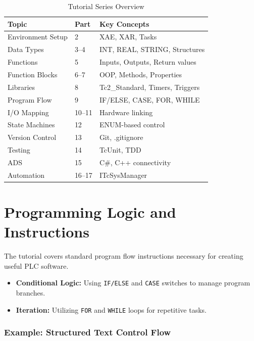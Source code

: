 \documentclass[11pt,a4paper]{article}
\begin{document}
\begin{table}[h]
\centering
\begin{tabular}{@{}lll@{}}
\toprule
\textbf{Topic} & \textbf{Part} & \textbf{Key Concepts} \\
\midrule
Environment Setup & 2 & XAE, XAR, Tasks \\
Data Types & 3--4 & INT, REAL, STRING, Structures \\
Functions & 5 & Inputs, Outputs, Return values \\
Function Blocks & 6--7 & OOP, Methods, Properties \\
Libraries & 8 & Tc2\_Standard, Timers, Triggers \\
Program Flow & 9 & IF/ELSE, CASE, FOR, WHILE \\
I/O Mapping & 10--11 & Hardware linking \\
State Machines & 12 & ENUM-based control \\
Version Control & 13 & Git, .gitignore \\
Testing & 14 & TcUnit, TDD \\
ADS & 15 & C\#, C++ connectivity \\
Automation & 16--17 & ITcSysManager \\
\bottomrule
\end{tabular}
\caption{Tutorial Series Overview}
\end{table}

\section{Programming Logic and Instructions}

The tutorial covers standard program flow instructions necessary for creating useful PLC software.

\begin{itemize}[leftmargin=*]
    \item \textbf{Conditional Logic:} Using \texttt{IF/ELSE} and \texttt{CASE} switches to manage program branches.
    \item \textbf{Iteration:} Utilizing \texttt{FOR} and \texttt{WHILE} loops for repetitive tasks.
\end{itemize}

\subsubsection*{Example: Structured Text Control Flow}
\end{document}
